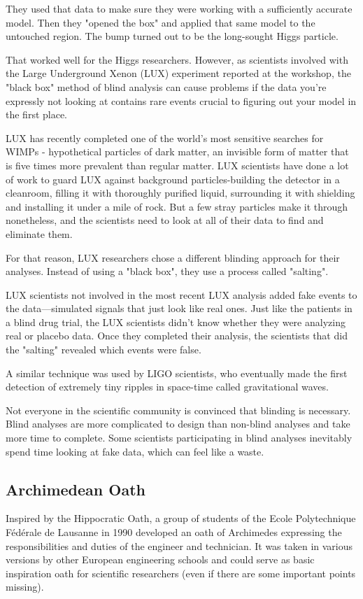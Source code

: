 	They used that data to make sure they were working with a sufficiently accurate model. Then they "opened the box" and applied that same model to the untouched region. The bump turned out to be the long-sought Higgs particle.

	That worked well for the Higgs researchers. However, as scientists involved with the Large Underground Xenon (LUX) experiment reported at the workshop, the "black box" method of blind analysis can cause problems if the data you're expressly not looking at contains rare events crucial to figuring out your model in the first place.
	
	LUX has recently completed one of the world's most sensitive searches for WIMPs - hypothetical particles of dark matter, an invisible form of matter that is five times more prevalent than regular matter. LUX scientists have done a lot of work to guard LUX against background particles-building the detector in a cleanroom, filling it with thoroughly purified liquid, surrounding it with shielding and installing it under a mile of rock. But a few stray particles make it through nonetheless, and the scientists need to look at all of their data to find and eliminate them.

	For that reason, LUX researchers chose a different blinding approach for their analyses. Instead of using a "black box", they use a process called "salting".

	LUX scientists not involved in the most recent LUX analysis added fake events to the data—simulated signals that just look like real ones. Just like the patients in a blind drug trial, the LUX scientists didn't know whether they were analyzing real or placebo data. Once they completed their analysis, the scientists that did the "salting" revealed which events were false.

	A similar technique was used by LIGO scientists, who eventually made the first detection of extremely tiny ripples in space-time called gravitational waves.

	Not everyone in the scientific community is convinced that blinding is necessary. Blind analyses are more complicated to design than non-blind analyses and take more time to complete. Some scientists participating in blind analyses inevitably spend time looking at fake data, which can feel like a waste.
	
	\pagebreak
	\subsection{Archimedean Oath}
	Inspired by the Hippocratic Oath, a group of students of the Ecole Polytechnique Fédérale de Lausanne in 1990 developed an oath of Archimedes expressing the responsibilities and duties of the engineer and technician. It was taken in various versions by other European engineering schools and could serve as basic inspiration oath for scientific researchers (even if there are some important points missing).

